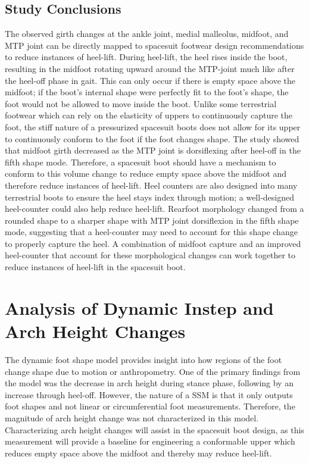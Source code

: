 \documentclass[defaultstyle,11pt]{thesis}
\begin{document}
\hypertarget{study-conclusions}{%
\subsection{Study Conclusions}\label{study-conclusions}}

The observed girth changes at the ankle joint, medial malleolus, midfoot, and MTP joint can be directly mapped to spacesuit footwear design recommendations to reduce instances of heel-lift.
During heel-lift, the heel rises inside the boot, resulting in the midfoot rotating upward around the MTP-joint much like after the heel-off phase in gait.
This can only occur if there is empty space above the midfoot; if the boot's internal shape were perfectly fit to the foot's shape, the foot would not be allowed to move inside the boot.
Unlike some terrestrial footwear which can rely on the elasticity of uppers to continuously capture the foot, the stiff nature of a pressurized spacesuit boots does not allow for its upper to continuously conform to the foot if the foot changes shape.
The study showed that midfoot girth decreased as the MTP joint is dorsiflexing after heel-off in the fifth shape mode.
Therefore, a spacesuit boot should have a mechanism to conform to this volume change to reduce empty space above the midfoot and therefore reduce instances of heel-lift.
Heel counters are also designed into many terrestrial boots to ensure the heel stays index through motion; a well-designed heel-counter could also help reduce heel-lift.
Rearfoot morphology changed from a rounded shape to a sharper shape with MTP joint dorsiflexion in the fifth shape mode, suggesting that a heel-counter may need to account for this shape change to properly capture the heel.
A combination of midfoot capture and an improved heel-counter that account for these morphological changes can work together to reduce instances of heel-lift in the spacesuit boot.

\hypertarget{analysis-of-dynamic-instep-and-arch-height-changes}{%
\section{Analysis of Dynamic Instep and Arch Height Changes}\label{analysis-of-dynamic-instep-and-arch-height-changes}}

The dynamic foot shape model provides insight into how regions of the foot change shape due to motion or anthropometry.
One of the primary findings from the model was the decrease in arch height during stance phase, following by an increase through heel-off.
However, the nature of a SSM is that it only outputs foot shapes and not linear or circumferential foot measurements.
Therefore, the magnitude of arch height change was not characterized in this model.
Characterizing arch height changes will assist in the spacesuit boot design, as this measurement will provide a baseline for engineering a conformable upper which reduces empty space above the midfoot and thereby may reduce heel-lift.
\end{document}
